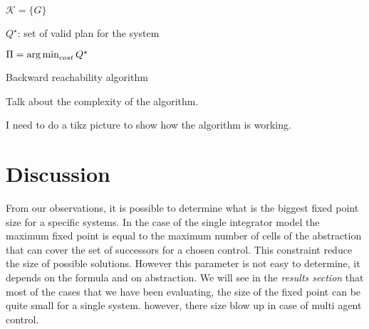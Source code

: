 
\begin{algorithm}[H]
\SetAlgoNoLine
{}
\KwResult{$\Fsc$} 

 $\mathcal{K} = \{ G \}$\;

 $Q^\star$: set of valid plan for the system\; 
 
 $\Pi = \operatorname*{arg\,min}_{cost}{Q^\star}$\;
 
 \caption{Backward reachability algorithm}
\end{algorithm}

Talk about the complexity of the algorithm.

I need to do a tikz picture to show how the algorithm is working.

\section{Discussion}
From our observations, it is possible to determine what is the biggest fixed point size for a specific systems.
In the case of the single integrator model the maximum fixed point is equal to the maximum number of cells of the abstraction that can cover the set of successors for a chosen control.
This constraint reduce the size of possible solutions.
However this parameter is not easy to determine, it depends on the formula and on abstraction.
We will see in the \textit{results section} that most of the cases that we have been evaluating, the size of the fixed point can be quite small for a single system. however, there size blow up in case of multi agent control.

